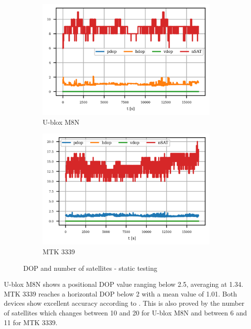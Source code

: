 \documentclass{article}
\begin{document}
			\begin{figure}[h]
		   		\centering
		     	\begin{subfigure}[b]{0.45\textwidth}
		      		\centering
		      	   \includegraphics[width=\textwidth]{Static/cond_dop_MTK 3339.png}
		      	   \caption{U-blox M8N}
		     	\end{subfigure}
		     	\begin{subfigure}[b]{0.45\textwidth}
		      	   \centering
		      	   \includegraphics[width=\textwidth]{Static/cond_dop_U-blox M8N.png}
		      	   \caption{MTK 3339}
		     	\end{subfigure}
		      \caption{DOP and number of satellites - static testing}
		      \label{fig:static_dop_gadgets}
			\end{figure}
			U-blox M8N shows a positional DOP value ranging below 2.5, averaging at 1.34. MTK 3339 reaches a horizontal DOP below 2 with a mean value of 1.01. Both devices show excellent accuracy according to \cite{tahsinAnalysisDOPIts2015}. This is also proved by the number of satellites which changes between 10 and 20 for U-blox M8N and between 6 and 11 for MTK 3339.
			
\end{document}
